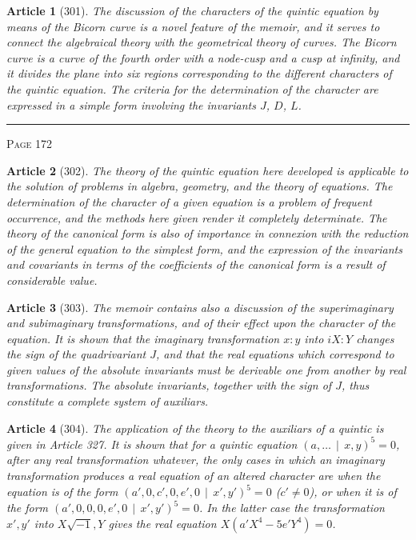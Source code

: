 \documentclass[11pt,a4paper]{article}
\theoremstyle{cayley}
\newtheorem{art}{Article}
\begin{document}
\begin{art}[301]
The discussion of the characters of the quintic equation by means of the Bicorn curve is a novel feature of the memoir, and it serves to connect the algebraical theory with the geometrical theory of curves. The Bicorn curve is a curve of the fourth order with a node-cusp and a cusp at infinity, and it divides the plane into six regions corresponding to the different characters of the quintic equation. The criteria for the determination of the character are expressed in a simple form involving the invariants $J$, $D$, $L$.
\end{art}

\vspace{1em}
\noindent\rule{\textwidth}{0.4pt}
\begin{center}\textsc{Page 172}\end{center}
\newpage

\begin{art}[302]
The theory of the quintic equation here developed is applicable to the solution of problems in algebra, geometry, and the theory of equations. The determination of the character of a given equation is a problem of frequent occurrence, and the methods here given render it completely determinate. The theory of the canonical form is also of importance in connexion with the reduction of the general equation to the simplest form, and the expression of the invariants and covariants in terms of the coefficients of the canonical form is a result of considerable value.
\end{art}

\begin{art}[303]
The memoir contains also a discussion of the superimaginary and subimaginary transformations, and of their effect upon the character of the equation. It is shown that the imaginary transformation $x:y$ into $iX:Y$ changes the sign of the quadrivariant $J$, and that the real equations which correspond to given values of the absolute invariants must be derivable one from another by real transformations. The absolute invariants, together with the sign of $J$, thus constitute a complete system of auxiliars.
\end{art}

\begin{art}[304]
The application of the theory to the auxiliars of a quintic is given in Article 327. It is shown that for a quintic equation $(a, \ldots \,\mid\, x, y)^5 = 0$, after any real transformation whatever, the only cases in which an imaginary transformation produces a real equation of an altered character are when the equation is of the form $(a', 0, c', 0, e', 0 \,\mid\, x', y')^5 = 0$ ($c' \neq 0$), or when it is of the form $(a', 0, 0, 0, e', 0 \,\mid\, x', y')^5 = 0$. In the latter case the transformation $x', y'$ into $X\sqrt{-1}, Y$ gives the real equation $X(a'X^4 - 5e'Y^4) = 0$.
\end{art}
\end{document}
